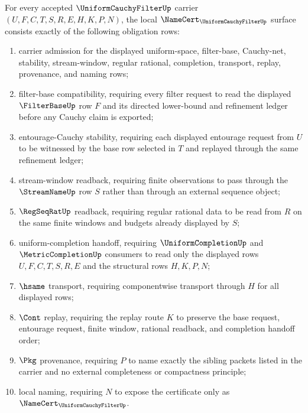 \begin{theorem}
\label{thm:uniform-cauchy-filter-namecert-obligations}
For every accepted $\UniformCauchyFilterUp$ carrier $(U,F,C,T,S,R,E,H,K,P,N)$, the local $\NameCert_{\UniformCauchyFilterUp}$ surface consists exactly of the following obligation rows:
\begin{enumerate}
\item carrier admission for the displayed uniform-space, filter-base, Cauchy-net, stability, stream-window, regular rational, completion, transport, replay, provenance, and naming rows;
\item filter-base compatibility, requiring every filter request to read the displayed $\FilterBaseUp$ row $F$ and its directed lower-bound and refinement ledger before any Cauchy claim is exported;
\item entourage-Cauchy stability, requiring each displayed entourage request from $U$ to be witnessed by the base row selected in $T$ and replayed through the same refinement ledger;
\item stream-window readback, requiring finite observations to pass through the $\StreamNameUp$ row $S$ rather than through an external sequence object;
\item $\RegSeqRatUp$ readback, requiring regular rational data to be read from $R$ on the same finite windows and budgets already displayed by $S$;
\item uniform-completion handoff, requiring $\UniformCompletionUp$ and $\MetricCompletionUp$ consumers to read only the displayed rows $U,F,C,T,S,R,E$ and the structural rows $H,K,P,N$;
\item $\hsame$ transport, requiring componentwise transport through $H$ for all displayed rows;
\item $\Cont$ replay, requiring the replay route $K$ to preserve the base request, entourage request, finite window, rational readback, and completion handoff order;
\item $\Pkg$ provenance, requiring $P$ to name exactly the sibling packets listed in the carrier and no external completeness or compactness principle;
\item local naming, requiring $N$ to expose the certificate only as $\NameCert_{\UniformCauchyFilterUp}$.
\end{enumerate}
\end{theorem}
